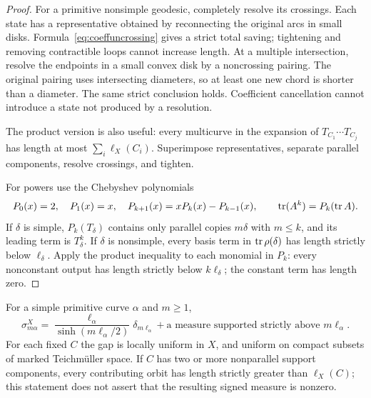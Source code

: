 \begin{proof}
For a primitive nonsimple geodesic, completely resolve its crossings.
Each state has a representative obtained by reconnecting the original
arcs in small disks. Formula~\eqref{eq:coeffuncrossing} gives a strict
total saving; tightening and removing contractible loops cannot
increase length. At a multiple intersection, resolve the endpoints
in a small convex disk by a noncrossing pairing. The original pairing
uses intersecting diameters, so at least one new chord is shorter
than a diameter. The same strict conclusion holds. Coefficient
cancellation cannot introduce a state not produced by a resolution.

The product version is also useful: every multicurve in the
expansion of $T_{C_1}\cdots T_{C_j}$ has length at most
$\sum_i\ell_X(C_i)$. Superimpose representatives, separate parallel
components, resolve crossings, and tighten.

For powers use the Chebyshev polynomials
\[
 P_0(x)=2,\quad P_1(x)=x,\quad
 P_{k+1}(x)=xP_k(x)-P_{k-1}(x),
 \qquad \operatorname{tr}(A^k)=P_k(\operatorname{tr} A).
\]
If $\delta$ is simple, $P_k(T_\delta)$ contains only parallel copies
$m\delta$ with $m\leq k$, and its leading term is $T_\delta^k$.
If $\delta$ is nonsimple, every basis term in $\operatorname{tr}\rho(\delta)$
has length strictly below $\ell_\delta$. Apply the product inequality
to each monomial in $P_k$: every nonconstant output has length
strictly below $k\ell_\delta$; the constant term has length zero.
\end{proof}

\begin{proposition}
\label{prop:coefffirstatom}
For a simple primitive curve $\alpha$ and $m\geq1$,
\begin{equation}
 \boxed{
 \sigma_{m\alpha}^X
 =\frac{\ell_\alpha}{\sinh(m\ell_\alpha/2)}
      \delta_{m\ell_\alpha}
   +\text{a measure supported strictly above }m\ell_\alpha.
 }
 \label{eq:coefffirstatom}
\end{equation}
For each fixed $C$ the gap is locally uniform in $X$, and uniform
on compact subsets of marked Teichm\"uller space. If $C$ has two
or more nonparallel support components, every contributing orbit
has length strictly greater than $\ell_X(C)$; this statement does
not assert that the resulting signed measure is nonzero.
\end{proposition}

